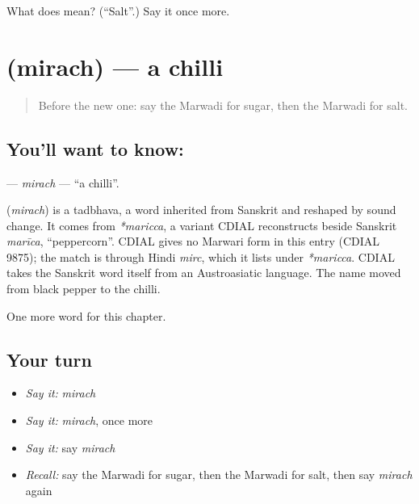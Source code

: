 \begin{tcolorbox}[breakable,colback=teal!4,colframe=teal!35!black,title={Before you move on}]
What does  mean? (\textquotedblleft{}Salt\textquotedblright{}.) Say it once more.
\end{tcolorbox}
\section[\texorpdfstring{\mw{मिरच} (mirach)}{मिरच (mirach)}]{ (mirach) — a chilli}

\label{lesson:MW-C60-mirach}



\begin{quote}
Before the new one: say the Marwadi for sugar, then the Marwadi for salt.
\end{quote}

\subsection*{You'll want to know: }
\textbf{} — \emph{mirach} — \textquotedblleft{}a chilli\textquotedblright{}.

\begin{cousinweb}
\textbf{} (\emph{mirach}) is a tadbhava, a word inherited from Sanskrit and reshaped by sound change. It comes from \emph{*maricca}, a variant CDIAL reconstructs beside Sanskrit \emph{marīca}, \textquotedblleft{}peppercorn\textquotedblright{}. CDIAL gives no Marwari form in this entry (CDIAL 9875); the match is through Hindi \emph{mirc}, which it lists under \emph{*maricca}. CDIAL takes the Sanskrit word itself from an Austroasiatic language. The name moved from black pepper to the chilli.
\end{cousinweb}

\begin{grammarlens}[title={What you've built}]
One more word for this chapter.
\end{grammarlens}

\subsection*{Your turn}
\begin{itemize}
\raggedright
  \item \emph{Say it:} \emph{mirach}
  \item \emph{Say it:} \emph{mirach}, once more
  \item \emph{Say it:} say \emph{mirach}
  \item \emph{Recall:} say the Marwadi for sugar, then the Marwadi for salt, then say \emph{mirach} again
\end{itemize}

